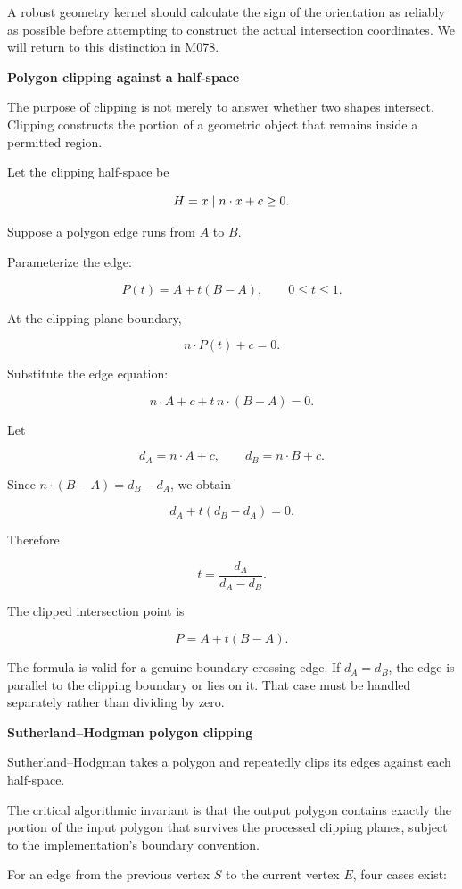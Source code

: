 A robust geometry kernel should calculate the sign of the orientation as reliably as possible before attempting to construct the actual intersection coordinates. We will return to this distinction in M078.

\textbf{Polygon clipping against a half-space}

The purpose of clipping is not merely to answer whether two shapes intersect. Clipping constructs the portion of a geometric object that remains inside a permitted region.

Let the clipping half-space be

\[
H=\\{x\mid n\cdot x+c\ge0\\}.
\]

Suppose a polygon edge runs from \(A\) to \(B\).

Parameterize the edge:

\[
P(t)=A+t(B-A),\qquad 0\le t\le1.
\]

At the clipping-plane boundary,

\[
n\cdot P(t)+c=0.
\]

Substitute the edge equation:

\[
n\cdot A+c+t\,n\cdot(B-A)=0.
\]

Let

\[
d_A=n\cdot A+c,\qquad d_B=n\cdot B+c.
\]

Since \(n\cdot(B-A)=d_B-d_A\), we obtain

\[
d_A+t(d_B-d_A)=0.
\]

Therefore

\[
\boxed{t=\frac{d_A}{d_A-d_B}}.
\]

The clipped intersection point is

\[
P=A+t(B-A).
\]

The formula is valid for a genuine boundary-crossing edge. If \(d_A=d_B\), the edge is parallel to the clipping boundary or lies on it. That case must be handled separately rather than dividing by zero.

\textbf{Sutherland--Hodgman polygon clipping}

Sutherland--Hodgman takes a polygon and repeatedly clips its edges against each half-space.

The critical algorithmic invariant is that the output polygon contains exactly the portion of the input polygon that survives the processed clipping planes, subject to the implementation's boundary convention.

For an edge from the previous vertex \(S\) to the current vertex \(E\), four cases exist:

